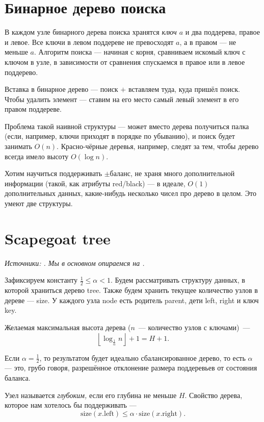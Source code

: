 \documentclass[a4paper,11pt]{article}
\begin{document}
\section{Бинарное дерево поиска}

В каждом узле бинарного дерева поиска хранятся {\it ключ $a$} и два поддерева, правое и левое. Все ключи в левом поддереве не превосходят $a$, а в правом — не меньше $a$. Алгоритм поиска — начиная с корня, сравниваем искомый ключ с ключом в узле, в зависимости от сравнения спускаемся в правое или в левое поддерево.

Вставка в бинарное дерево — поиск $+$ вставляем туда, куда пришёл поиск. Чтобы удалить элемент --- ставим на его место самый левый элемент в его правом поддереве.

Проблема такой наивной структуры — может вместо дерева получиться палка (если, например, ключи приходят в порядке по убыванию), и поиск будет занимать $O(n)$. Красно-чёрные деревья, например, следят за тем, чтобы дерево всегда имело высоту $O(\log n)$.

Хотим научиться поддерживать $\pm$баланс, не храня много дополнительной информации (такой, как атрибуты red/black) — в идеале, $O(1)$ дополнительных данных, какие-нибудь несколько чисел про дерево в целом. Это умеют две структуры.

\section{Scapegoat tree}

{\it Источники: \cite{galperin1993scapegoat,andersson1989improving}. Мы в основном опираемся на \cite{galperin1993scapegoat}.}

Зафиксируем константу $\frac{1}{2} \le \alpha < 1$. Будем рассматривать структуру данных, в которой храниться дерево tree. Также будем хранить текущее количество узлов в дереве — size. У каждого узла node есть родитель parent, дети left, right и ключ key.

Желаемая максимальная высота дерева ($n$~— количество узлов с ключами)~—
$$\left\lfloor \log_{\frac{1}{\alpha}} n \right\rfloor + 1= H+1.$$

Если $\alpha = \frac{1}{2}$, то результатом будет идеально сбалансированное дерево, то есть $\alpha$ — это, грубо говоря, разрешённое отклонение размера поддеревьев от состояния баланса.

Узел называется {\it глубоким,} если его глубина не меньше $H$. Свойство дерева, которое нам хотелось бы поддерживать —
	$$\mathrm{size} (x.\text{left}) \le \alpha \cdot \mathrm{size} (x.\text{right}).$$
\end{document}
